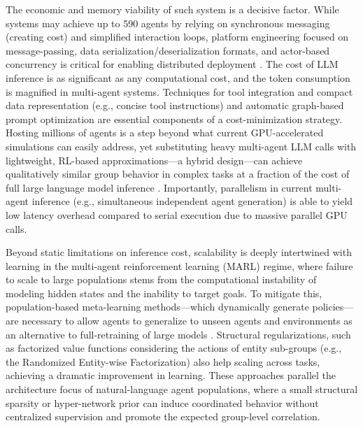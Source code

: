 \documentclass[11pt,a4paper]{article}
\begin{document}
The economic and memory viability of such system is a decisive factor. While systems may achieve up to 590 agents by relying on synchronous messaging (creating cost) and simplified interaction loops, platform engineering focused on message-passing, data serialization/deserialization formats, and actor-based concurrency is critical for enabling distributed deployment \cite{arxiv:2402.14034v1}. The cost of LLM inference is as significant as any computational cost, and the token consumption is magnified in multi-agent systems. Techniques for tool integration and compact data representation (e.g., concise tool instructions) and automatic graph-based prompt optimization \cite{arxiv:2401.06201v3,arxiv:2402.16823v2} are essential components of a cost-minimization strategy. Hosting millions of agents is a step beyond what current GPU-accelerated simulations can easily address, yet substituting heavy multi-agent LLM calls with lightweight, RL-based approximations---a hybrid design---can achieve qualitatively similar group behavior in complex tasks at a fraction of the cost of full large language model inference \cite{arxiv:2107.06857v1,arxiv:2003.08039v3}. Importantly, parallelism in current multi-agent inference (e.g., simultaneous independent agent generation) is able to yield low latency overhead compared to serial execution due to massive parallel GPU calls.

Beyond static limitations on inference cost, scalability is deeply intertwined with learning in the multi-agent reinforcement learning (MARL) regime, where failure to scale to large populations stems from the computational instability of modeling hidden states and the inability to target goals. To mitigate this, population-based meta-learning methods---which dynamically generate policies---are necessary to allow agents to generalize to unseen agents and environments as an alternative to full-retraining of large models \cite{arxiv:2304.14721v4} \cite{arxiv:2110.14241v1}. Structural regularizations, such as factorized value functions considering the actions of entity sub-groups (e.g., the Randomized Entity-wise Factorization) \cite{arxiv:2006.04222v3} also help scaling across tasks, achieving a dramatic improvement in learning. These approaches parallel the architecture focus of natural-language agent populations, where a small structural sparsity or hyper-network prior can induce coordinated behavior without centralized supervision and promote the expected group-level correlation.
\end{document}
